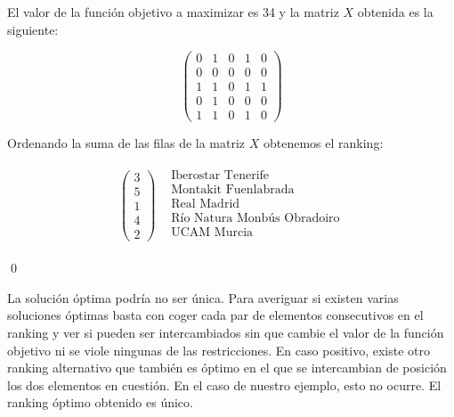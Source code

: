 El valor de la función objetivo a maximizar es 34 y la matriz $X$ obtenida es la siguiente: 	
	
\[	
	\left( \begin{array}{ccccc}
	0 & 1 & 0 & 1 & 0\\
	0 & 0 & 0 & 0 & 0\\
	1 & 1 & 0 & 1 & 1\\
	0 & 1 & 0 & 0 & 0\\
	1 & 1 & 0 & 1 & 0
	\end{array} \right) 
\]
	
Ordenando la suma de las filas de la matriz $X$ obtenemos el ranking:

\[
\begin{array}{cc}
\left(\begin{array}{c}
3\\
5\\
1\\
4\\
2
\end{array} \right) & \begin{array}{c}
\text{Iberostar Tenerife} \\
\text{Montakit Fuenlabrada} \\
\text{Real Madrid} \\
\text{Río Natura Monbús Obradoiro} \\
\text{UCAM Murcia} \\
\end{array} 
\end{array} 
\]	
	
\qed	

La solución óptima podría no ser única. Para averiguar si existen varias soluciones óptimas basta con coger cada par de elementos consecutivos en el ranking y ver si pueden ser intercambiados sin que cambie el valor de la función objetivo ni se viole ningunas de las restricciones. En caso positivo, existe otro ranking alternativo que también es óptimo en el que se intercambian de posición los dos elementos en cuestión. En el caso de nuestro ejemplo, esto no ocurre. El ranking óptimo obtenido es único.\\ 

